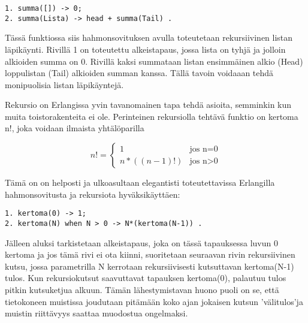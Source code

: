 \documentclass[11pt,oneside,a4paper]{article}
\begin{document}
\begin{verbatim}
1. summa([]) -> 0;
2. summa(Lista) -> head + summa(Tail) .  
\end{verbatim}


Tässä funktiossa siis hahmonsovituksen avulla toteutetaan rekursiivinen listan
läpikäynti. Rivillä 1 on toteutettu alkeistapaus, jossa lista on tyhjä ja
jolloin alkioiden summa on 0. Rivillä kaksi summataan listan ensimmäinen alkio
(Head) loppulistan 
(Tail) alkioiden summan kanssa. Tällä tavoin voidaaan tehdä monipuolisia listan
läpikäyntejä. 

Rekursio on Erlangissa yvin tavanomainen tapa tehdä asioita, semminkin kun muita
toistorakenteita ei ole. Perinteinen rekursiolla tehtävä funktio on kertoma n!,
joka voidaan ilmaista yhtälöparilla 

\begin{displaymath}
n! = \left\{ \begin{array}{ll}
1 & \textrm{jos n=0}\\
n*((n-1)!) & \textrm{{jos n>0}}
\end{array} \right.
\end{displaymath}

Tämä on on helposti ja ulkoasultaan elegantisti toteutettavissa Erlangilla
hahmonsovitusta ja rekursiota hyväksikäyttäen:
\begin{verbatim}
1. kertoma(0) -> 1;
2. kertoma(N) when N > 0 -> N*(kertoma(N-1)) .
\end{verbatim}
Jälleen aluksi tarkistetaan alkeistapaus, joka on tässä tapauksessa luvun 0
kertoma ja jos tämä rivi ei ota kiinni, suoritetaan seuraavan rivin
rekursiivinen kutsu, jossa parametrilla N kerrotaan rekursiivisesti kutsuttavan
kertoma(N-1) tulos.
Kun rekursiokutsut saavuttavat tapauksen kertoma(0), palautuu tulos pitkin
kutsuketjua alkuun. Tämän lähestymistavan huono puoli on se, että tietokoneen
muistissa joudutaan pitämään koko ajan jokaisen kutsun 'välitulos'ja muistin riittävyys saattaa muodostua ongelmaksi. 


\end{document}
